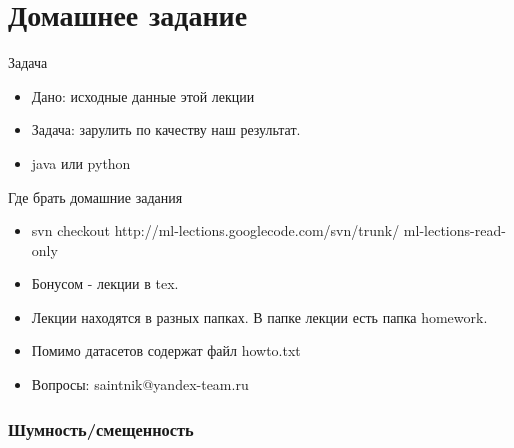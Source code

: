 \documentclass[14pt, fleqn, xcolor={dvipsnames, table}, hyperref={unicode}, babel={english,russian}, inputenc=utf8x]{beamer}
\begin{document}
\section{Домашнее задание}
\begin{frame}{Задача}

\begin{itemize}
  \item Дано: исходные данные этой лекции
  \item Задача: зарулить по качеству наш результат.
  \item java или python
\end{itemize}
\end{frame}

\begin{frame}{Где брать домашние задания}
\begin{itemize}
  \item svn checkout http://ml-lections.googlecode.com/svn/trunk/ ml-lections-read-only
  \item Бонусом - лекции в tex.
  \item Лекции находятся в разных папках. В папке лекции есть папка homework.
  \item Помимо датасетов содержат файл howto.txt
  \item Вопросы: saintnik@yandex-team.ru
\end{itemize}

\end{frame}


\subsubsection{Шумность/смещенность}
\end{document}
